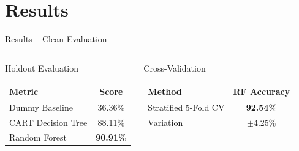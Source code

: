 \documentclass[aspectratio=169]{beamer}
\begin{document}
\section{Results}
\begin{frame}{Results -- Clean Evaluation}
  \begin{columns}[t]
      \begin{block}{Holdout Evaluation}
        \vspace{0.3em}
        \begin{tabular}{lc}
          \toprule
          \textbf{Metric} & \textbf{Score} \\
          \midrule
          Dummy Baseline & 36.36\% \\
          CART Decision Tree & 88.11\% \\
          Random Forest & \textbf{90.91\%} \\
          \bottomrule
        \end{tabular}
      \end{block}
      \vspace{0.5em}
      \begin{block}{Cross-Validation}
        \vspace{0.3em}
        \begin{tabular}{lc}
          \toprule
          \textbf{Method} & \textbf{RF Accuracy} \\
          \midrule
          Stratified 5-Fold CV & \textbf{92.54\%} \\
          Variation & $\pm$4.25\% \\
          \bottomrule
        \end{tabular}
      \end{block}


\end{columns}
\end{frame}
\end{document}
